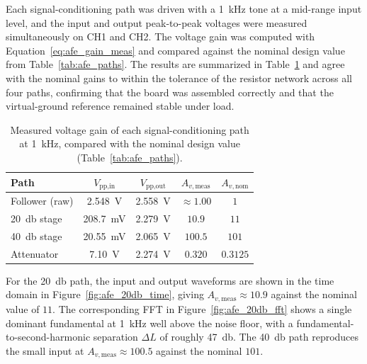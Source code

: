 Each signal-conditioning path was driven with a \SI{1}{\kilo\hertz} tone at a mid-range input level, and the input and output peak-to-peak voltages were measured simultaneously on CH1 and CH2. The voltage gain was computed with Equation~\eqref{eq:afe_gain_meas} and compared against the nominal design value from Table~\ref{tab:afe_paths}. The results are summarized in Table~\ref{tab:res_afe_gain} and agree with the nominal gains to within the tolerance of the resistor network across all four paths, confirming that the board was assembled correctly and that the virtual-ground reference remained stable under load.

\begin{table}[h!]
\centering
\begin{tabular}{lcccc}
\hline
\textbf{Path} & \textbf{$V_{\text{pp,in}}$} & \textbf{$V_{\text{pp,out}}$} & \textbf{$A_{v,\text{meas}}$} & \textbf{$A_{v,\text{nom}}$} \\
\hline
Follower (raw)          & \SI{2.548}{\volt}  & \SI{2.558}{\volt}  & $\approx 1.00$  & $1$      \\
\SI{20}{\decibel} stage & \SI{208.7}{\milli\volt} & \SI{2.279}{\volt}  & $10.9$          & $11$     \\
\SI{40}{\decibel} stage & \SI{20.55}{\milli\volt} & \SI{2.065}{\volt}  & $100.5$         & $101$    \\
Attenuator              & \SI{7.10}{\volt}   & \SI{2.274}{\volt}  & $0.320$         & $0.3125$ \\
\hline
\end{tabular}
\caption{Measured voltage gain of each signal-conditioning path at \SI{1}{\kilo\hertz}, compared with the nominal design value (Table~\ref{tab:afe_paths}).}
\label{tab:res_afe_gain}
\end{table}

For the \SI{20}{\decibel} path, the input and output waveforms are shown in the time domain in Figure~\ref{fig:afe_20db_time}, giving $A_{v,\text{meas}} \approx 10.9$ against the nominal value of $11$. The corresponding FFT in Figure~\ref{fig:afe_20db_fft} shows a single dominant fundamental at \SI{1}{\kilo\hertz} well above the noise floor, with a fundamental-to-second-harmonic separation $\Delta L$ of roughly \SI{47}{\decibel}.  The \SI{40}{\decibel} path reproduces the small input at $A_{v,\text{meas}} \approx 100.5$ against the nominal $101$.

